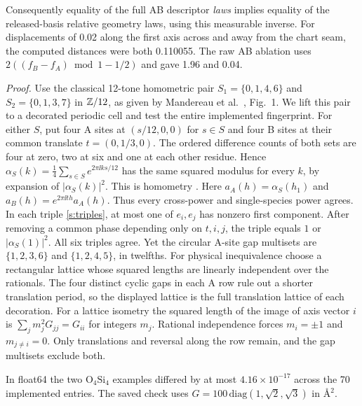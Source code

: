 Consequently equality of the full AB descriptor \emph{laws} implies equality of the released-basis relative geometry laws, using this measurable inverse. For displacements of 0.02 along the first axis across and away from the chart seam, the computed distances were both 0.110055. The raw AB ablation uses $2((f_B-f_A)\bmod1-1/2)$ and gave 1.96 and 0.04.

\noindent\emph{Proof.}
Use the classical 12-tone homometric pair $S_1=\{0,1,4,6\}$ and $S_2=\{0,1,3,7\}$ in $\mathbb Z/12$, as given by Mandereau et al.\ \cite{zrelation}, Fig.~1. We lift this pair to a decorated periodic cell and test the entire implemented fingerprint. For either $S$, put four A sites at $(s/12,0,0)$ for $s\in S$ and four B sites at their common translate $t=(0,1/3,0)$. The ordered difference counts of both sets are four at zero, two at six and one at each other residue. Hence $\alpha_S(k)=\tfrac14\sum_{s\in S}e^{2\pi\ii ks/12}$ has the same squared modulus for every $k$, by expansion of $|\alpha_S(k)|^2$. This is homometry \cite{homometry}. Here $a_A(h)=\alpha_S(h_1)$ and $a_B(h)=e^{2\pi\ii th}a_A(h)$. Thus every cross-power and single-species power agrees. In each triple \eqref{s:triples}, at most one of $e_i,e_j$ has nonzero first component. After removing a common phase depending only on $t,i,j$, the triple equals $1$ or $|\alpha_S(1)|^2$. All six triples agree. Yet the circular A-site gap multisets are $\{1,2,3,6\}$ and $\{1,2,4,5\}$, in twelfths. For physical inequivalence choose a rectangular lattice whose squared lengths are linearly independent over the rationals. The four distinct cyclic gaps in each A row rule out a shorter translation period, so the displayed lattice is the full translation lattice of each decoration. For a lattice isometry the squared length of the image of axis vector $i$ is $\sum_j m_j^2 G_{jj}=G_{ii}$ for integers $m_j$. Rational independence forces $m_i=\pm1$ and $m_{j\ne i}=0$. Only translations and reversal along the row remain, and the gap multisets exclude both. \proofend

In float64 the two $\mathrm{O}_4\mathrm{Si}_4$ examples differed by at most $4.16\times10^{-17}$ across the 70 implemented entries. The saved check uses $G=100\,\mathrm{diag}(1,\sqrt2,\sqrt3)$ in \AA$^2$.

\newpage
